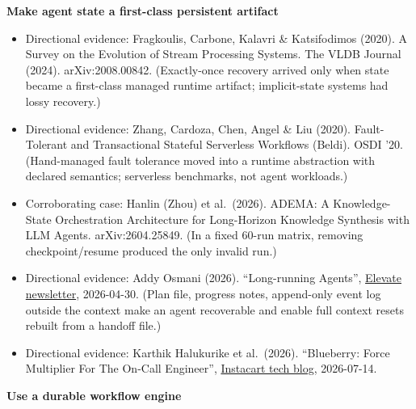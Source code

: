\textbf{Make agent state a first-class persistent artifact}

\begin{itemize}
\tightlist
\item
  Directional evidence: Fragkoulis, Carbone, Kalavri \& Katsifodimos (2020). A Survey on the Evolution of Stream Processing Systems. The VLDB Journal (2024). arXiv:2008.00842. (Exactly-once recovery arrived only when state became a first-class managed runtime artifact; implicit-state systems had lossy recovery.)
\item
  Directional evidence: Zhang, Cardoza, Chen, Angel \& Liu (2020). Fault-Tolerant and Transactional Stateful Serverless Workflows (Beldi). OSDI '20. (Hand-managed fault tolerance moved into a runtime abstraction with declared semantics; serverless benchmarks, not agent workloads.)
\item
  Corroborating case: Hanlin (Zhou) et al.~(2026). ADEMA: A Knowledge-State Orchestration Architecture for Long-Horizon Knowledge Synthesis with LLM Agents. arXiv:2604.25849. (In a fixed 60-run matrix, removing checkpoint/resume produced the only invalid run.)
\item
  Directional evidence: Addy Osmani (2026). ``Long-running Agents'', \href{https://addyo.substack.com/p/long-running-agents}{Elevate newsletter}, 2026-04-30. (Plan file, progress notes, append-only event log outside the context make an agent recoverable and enable full context resets rebuilt from a handoff file.)
\item
  Directional evidence: Karthik Halukurike et al.~(2026). ``Blueberry: Force Multiplier For The On-Call Engineer'', \href{https://tech.instacart.com/blueberry-force-multiplier-for-the-on-call-engineer-98c446dfcc12}{Instacart tech blog}, 2026-07-14.
\end{itemize}

\textbf{Use a durable workflow engine}


